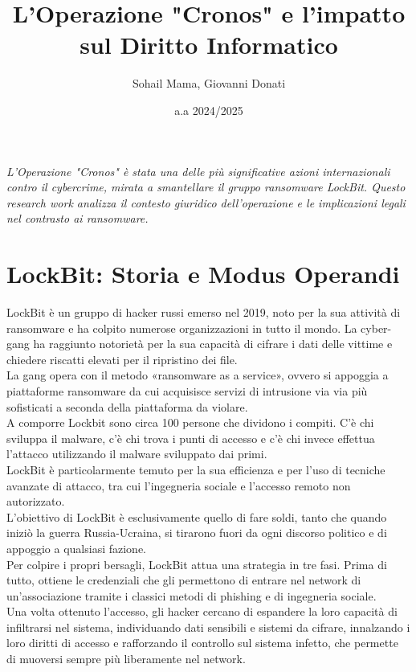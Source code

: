 \documentclass[a4paper,12pt]{article}
\title{L'Operazione "Cronos" e l'impatto sul Diritto Informatico}
\author{Sohail Mama, Giovanni Donati}
\date{a.a 2024/2025}
\begin{document}
\maketitle

\vfill
\begin{center}
\textit{L'Operazione "Cronos" è stata una delle più significative azioni internazionali contro il cybercrime, mirata a smantellare il gruppo ransomware LockBit. Questo research work analizza il contesto giuridico dell'operazione e le implicazioni legali nel contrasto ai ransomware.}
\end{center}
\vfill

\newpage
\tableofcontents
\newpage

\section{LockBit: Storia e Modus Operandi}
LockBit è un gruppo di hacker russi emerso nel 2019, noto per la sua attività di ransomware e ha colpito numerose organizzazioni in tutto il mondo. La cyber-gang ha raggiunto notorietà per la sua capacità di cifrare i dati delle vittime e chiedere riscatti elevati per il ripristino dei file. \\
La gang opera con il metodo «ransomware as a service», ovvero si appoggia a piattaforme ransomware da cui acquisisce servizi di intrusione via via più sofisticati a seconda della piattaforma da violare.\\
A comporre Lockbit sono circa 100 persone che dividono i compiti. C'è chi sviluppa il malware, c'è chi trova i punti di accesso e c'è chi invece effettua l'attacco utilizzando il malware sviluppato dai primi.\\
LockBit è particolarmente temuto per la sua efficienza e per l'uso di tecniche avanzate di attacco, tra cui l'ingegneria sociale e l'accesso remoto non autorizzato.\\
L'obiettivo di LockBit è esclusivamente quello di fare soldi, tanto che quando iniziò la guerra Russia-Ucraina, si tirarono fuori da ogni discorso politico e di appoggio a qualsiasi fazione.\\
Per colpire i propri bersagli, LockBit attua una strategia in tre fasi. Prima di tutto, ottiene le credenziali che gli permettono di entrare nel network di un'associazione tramite i classici metodi di phishing e di ingegneria sociale.\\
Una volta ottenuto l'accesso, gli hacker cercano di espandere la loro capacità di infiltrarsi nel sistema, individuando dati sensibili e sistemi da cifrare, innalzando i loro diritti di accesso e rafforzando il controllo sul sistema infetto, che permette di muoversi sempre più liberamente nel network. \\
\end{document}

